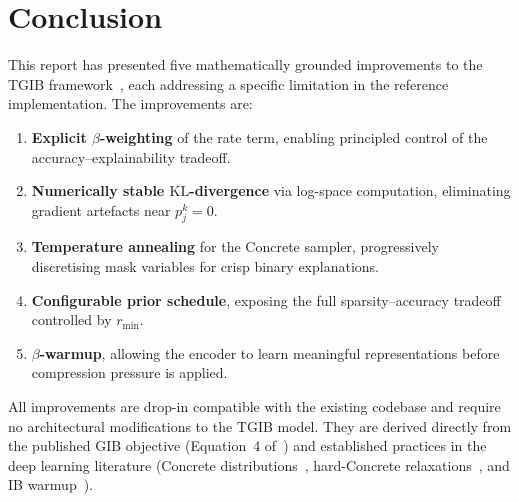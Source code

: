 \documentclass[11pt,a4paper]{article}
\newcommand{\KL}{\mathrm{KL}}
\begin{document}
\section{Conclusion}
\label{sec:conclusion}

This report has presented five mathematically grounded improvements to
the TGIB framework~\cite{seo2024tgib}, each addressing a specific
limitation in the reference implementation. The improvements are:

\begin{enumerate}[leftmargin=*,itemsep=2pt]
  \item \textbf{Explicit $\beta$-weighting} of the rate term, enabling
        principled control of the accuracy--explainability tradeoff.
  \item \textbf{Numerically stable $\KL$-divergence} via log-space
        computation, eliminating gradient artefacts near $p_j^k = 0$.
  \item \textbf{Temperature annealing} for the Concrete sampler,
        progressively discretising mask variables for crisp binary
        explanations.
  \item \textbf{Configurable prior schedule}, exposing the full
        sparsity--accuracy tradeoff controlled by $r_{\min}$.
  \item \textbf{$\beta$-warmup}, allowing the encoder to learn
        meaningful representations before compression pressure is
        applied.
\end{enumerate}

All improvements are drop-in compatible with the existing codebase and
require no architectural modifications to the TGIB model. They are
derived directly from the published GIB objective
(Equation~4 of~\cite{seo2024tgib}) and established practices in the
deep learning literature (Concrete
distributions~\cite{maddison2017concrete}, hard-Concrete
relaxations~\cite{louizos2018deep}, and IB
warmup~\cite{alemi2016deep}).
\end{document}
